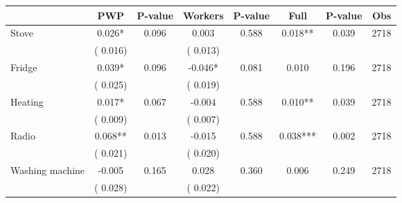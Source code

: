 
\begin{tabular}{l*{7}{c}}\hline&\multicolumn{1}{c}{PWP}&\multicolumn{1}{c}{P-value}&\multicolumn{1}{c}{Workers}&\multicolumn{1}{c}{P-value}&\multicolumn{1}{c}{Full}&\multicolumn{1}{c}{P-value}&\multicolumn{1}{c}{Obs} \\ \hline

 Stove       &              0.026*       &        0.096  &              0.003       &        0.588  &              0.018**       &              0.039 &  2718 \\ 
                       &       (       0.016)             &                               &       (       0.013)                     &                               &                                               &                                &                      \\ 

 Fridge       &              0.039*       &        0.096  &             -0.046*       &        0.081  &              0.010       &              0.196 &  2718 \\ 
                       &       (       0.025)             &                               &       (       0.019)                     &                               &                                               &                                &                      \\ 

 Heating       &              0.017*       &        0.067  &             -0.004       &        0.588  &              0.010**       &              0.039 &  2718 \\ 
                       &       (       0.009)             &                               &       (       0.007)                     &                               &                                               &                                &                      \\ 

 Radio       &              0.068**       &        0.013  &             -0.015       &        0.588  &              0.038***       &              0.002 &  2718 \\ 
                       &       (       0.021)             &                               &       (       0.020)                     &                               &                                               &                                &                      \\ 

 Washing machine       &             -0.005       &        0.165  &              0.028       &        0.360  &              0.006       &              0.249 &  2718 \\ 
                       &       (       0.028)             &                               &       (       0.022)                     &                               &                                               &                                &                      \\ 


\end{tabular}

